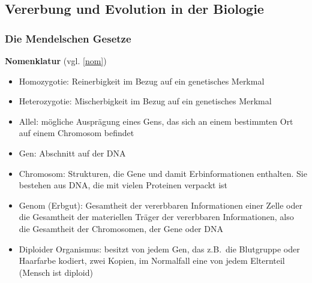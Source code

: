 \subsection{Vererbung und Evolution in der Biologie}

\subsubsection{Die Mendelschen Gesetze}

\textbf{Nomenklatur} (vgl. \autoref{nom})
\begin{itemize}
	\item Homozygotie: Reinerbigkeit im Bezug auf ein genetisches Merkmal
	\item Heterozygotie: Mischerbigkeit im Bezug auf ein genetisches Merkmal
	\item Allel: mögliche Ausprägung eines Gens, das sich an einem bestimmten Ort auf einem Chromosom befindet
	\item Gen: Abschnitt auf der DNA
	\item Chromosom: Strukturen, die Gene und damit Erbinformationen enthalten. Sie bestehen aus DNA, die mit vielen Proteinen verpackt ist
	\item Genom (Erbgut): Gesamtheit der vererbbaren Informationen einer Zelle oder die Gesamtheit der materiellen Träger der vererbbaren Informationen, also die Gesamtheit der Chromosomen, der Gene oder DNA
	\item Diploider Organismus: besitzt von jedem Gen, das z.B.\ die Blutgruppe oder Haarfarbe kodiert, zwei Kopien, im Normalfall eine von jedem Elternteil (Mensch ist diploid)
\end{itemize}


